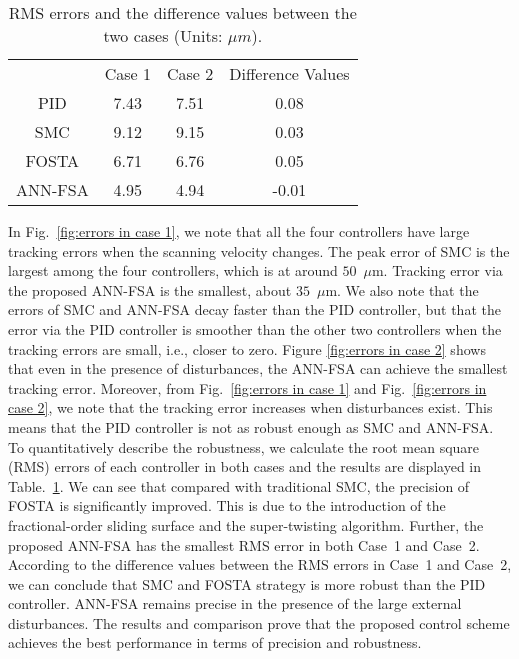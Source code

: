 \documentclass{ifacconf}
\begin{document}
   \begin{table}[tp]
   \centering
   \caption{RMS errors and the difference values between the two cases (Units: $\mu m$).}
   \label{table:RMS Error}
   \begin{tabular}{cccc}
   \cline{1-4}
    & Case 1 & Case 2 & Difference Values\\
    \cline{1-4}
    PID & 7.43 & 7.51 & 0.08 \\
    SMC & 9.12 & 9.15 & 0.03 \\
    FOSTA & 6.71 & 6.76 & 0.05 \\
    ANN-FSA & 4.95 & 4.94 & -0.01 \\
    \cline{1-4}
    \end{tabular}
    \end{table}
    \linespread{1}
   
   In Fig.~\ref{fig:errors in case 1}, we note that all the four controllers have large tracking errors when the scanning velocity changes. The peak error of SMC is the largest among the four controllers, which is at around $50$~$\mu$m. Tracking error via the proposed ANN-FSA is the smallest, about $35$~$\mu$m. We also note that the errors of SMC and ANN-FSA decay faster than the PID controller, but that the error via the PID controller is smoother than the other two controllers when the tracking errors are small, i.e., closer to zero. Figure \ref{fig:errors in case 2} shows that even in the presence of disturbances, the ANN-FSA can achieve the smallest tracking error. Moreover, from Fig.~\ref{fig:errors in case 1} and Fig.~\ref{fig:errors in case 2}, we note that the tracking error increases when disturbances exist. This means that the PID controller is not as robust enough as SMC and ANN-FSA. To quantitatively describe the robustness, we calculate the root mean square (RMS) errors of each controller in both cases and the results are displayed in Table.~\ref{table:RMS Error}. We can see that compared with traditional SMC, the precision of FOSTA is significantly improved. This is due to the introduction of the fractional-order sliding surface and the super-twisting algorithm. Further, the proposed ANN-FSA has the smallest RMS error in both Case~1 and Case~2. According to the difference values between the RMS errors in Case~1 and Case~2, we can conclude that SMC and FOSTA strategy is more robust than the PID controller. ANN-FSA remains precise in the presence of the large external disturbances. The results and comparison prove that the proposed control scheme achieves the best performance in terms of precision and robustness. 
   
\end{document}
